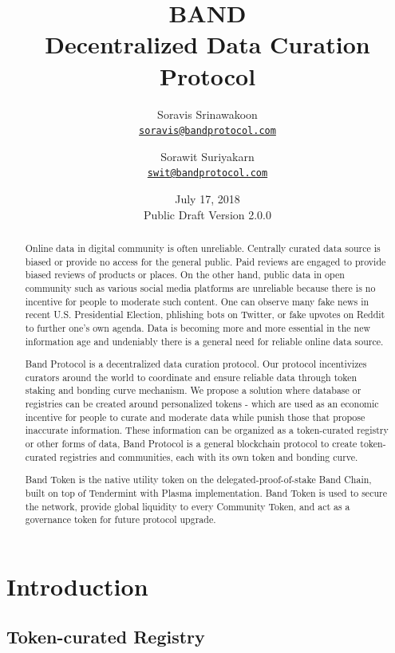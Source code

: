 \documentclass[letterpaper,11pt]{article}
\title{\LARGE BAND\\
	\Large Decentralized Data Curation Protocol}
\author{
		Soravis Srinawakoon\\
		\small\href{mailto:soravis@bandprotocol.com}
			{\nolinkurl{soravis@bandprotocol.com}}
	\and 
		Sorawit Suriyakarn\\
		\small\href{mailto:swit@bandprotocol.com}
			{\nolinkurl{swit@bandprotocol.com}}
	}
\date{July 17, 2018 \\\small Public Draft Version 2.0.0}
\begin{document}
\maketitle

\begin{abstract}

Online data in digital community is often unreliable. Centrally curated data source is biased or provide no access for the general public. Paid reviews are engaged to provide biased reviews of products or places. On the other hand, public data in open community such as various social media platforms are unreliable because there is no incentive for people to moderate such content. One can observe many fake news in recent U.S. Presidential Election, phlishing bots on Twitter, or fake upvotes on Reddit to further one's own agenda. Data is becoming more and more essential in the new information age and undeniably there is a general need for reliable online data source.

Band Protocol is a decentralized data curation protocol. Our protocol incentivizes curators around the world to coordinate and ensure reliable data through token staking and bonding curve mechanism. We propose a solution where database or registries can be created around personalized tokens - which are used as an economic incentive for people to curate and moderate data while punish those that propose inaccurate information. These information can be organized as a token-curated registry or other forms of data, Band Protocol is a general blockchain protocol to create token-curated registries and communities, each with its own token and bonding curve.  

Band Token is the native utility token on the delegated-proof-of-stake Band Chain, built on top of Tendermint with Plasma implementation. Band Token is used to secure the network, provide global liquidity to every Community Token, and act as a governance token for future protocol upgrade. 

\end{abstract}

\newpage
{
\hypersetup{linkcolor=black}
\tableofcontents
}
\newpage

\section{Introduction}

\subsection{Token-curated Registry} 
\end{document}
